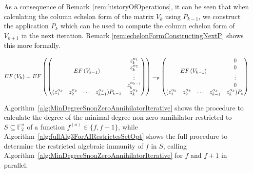 \documentclass[11pt]{llncs}
\begin{document}



As a consequence of Remark~\ref{rem:historyOfOperations}, it can be seen that when calculating the column echelon form of the matrix $V_k$ using $P_{k-1}$, we construct the application $P_k$ which can be used to compute the column echelon form of $V_{k+1}$ in the next iteration. Remark \ref{rem:echelonFormConstructingNextP} shows this more formally.

\begin{remark}\label{rem:echelonFormConstructingNextP}
    \begin{align*}
        EF\left(V_{k}\right) =
        EF
        \begin{pmatrix}
        \begin{pmatrix}
            \multicolumn{4}{c}{\multirow{4}{*}{$EF\left(V_{k-1}\right)$}} & z_k^{\alpha_1}\\
            & & & & z_k^{\alpha_2}\\
            & & & & \vdots\\
            & & & & z_{k}^{\alpha_{k-1}}\\
            (z_1^{\alpha_{k}} & z_2^{\alpha_{k}}& \cdots & z_{k-1}^{\alpha_{k}})P_{k-1} & z_{k}^{\alpha_k}
        \end{pmatrix}
        \end{pmatrix}
        =_p 
        \begin{pmatrix}
            \multicolumn{4}{c}{\multirow{4}{*}{$EF\left(V_{k-1}\right)$}} & 0\\
            & & & & 0\\
            & & & & \vdots\\
            & & & & 0\\
            (z_1^{\alpha_{k}} & z_2^{\alpha_{k}}& \cdots & z_{k-1}^{\alpha_{k}} & z_{k}^{\alpha_k})P_{k}
        \end{pmatrix}
    \end{align*}
\end{remark}

Algorithm~\ref{alg:MinDegreeSnonZeroAnnihilatorIterative} shows the procedure to calculate the degree of the minimal degree non-zero-annihilator 
restricted to $S\subseteq \mathbb{F}_2^n$ of a function $f^{(o)} \in \{f, f+ 1\}$, while Algorithm~\ref{alg:fullAlg3ForAIRestrictesSetOpt} shows the full procedure to determine the restricted algebraic immunity of $f$ in $S$, calling Algorithm~\ref{alg:MinDegreeSnonZeroAnnihilatorIterative} for $f$ and $f+ 1$ in parallel.
\end{document}
